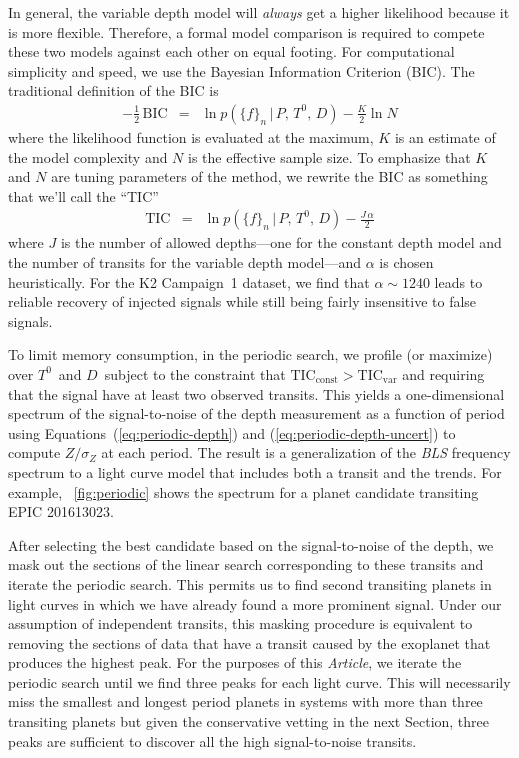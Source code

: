 \documentclass[12pt,preprint]{aastex}
\newcommand{\project}[1]{\textsl{#1}} %
\newcommand{\paper}{\textsl{Article}}
\newcommand{\figref}[1]{\ref{fig:#1}}
\newcommand{\Fig}[1]{\figurename~\figref{#1}}
\newcommand{\fig}[1]{\Fig{#1}}
\newcommand{\sectionname}{Section}
\newcommand{\BIC}{{\ensuremath{\mathrm{BIC}}}}
\newcommand{\TIC}{{\ensuremath{\mathrm{TIC}}}}
\newcommand{\flux}{{\ensuremath{f}}}
\newcommand{\period}{{\ensuremath{P}}}
\newcommand{\phase}{{\ensuremath{T^0}}}
\newcommand{\duration}{{\ensuremath{D}}}
\newcommand{\depth}{{\ensuremath{Z}}}
\begin{document}
In general, the variable depth model will \emph{always} get a higher
likelihood because it is more flexible.
Therefore, a formal model comparison is required to compete these two models
against each other on equal footing.
For computational simplicity and speed, we use the Bayesian Information
Criterion (BIC).
The traditional definition of the BIC is
\begin{eqnarray}
-\frac{1}{2}\,\BIC &=&
    \ln p(\{\flux\}_n\,|\,\period,\,\phase,\,\duration)
    - \frac{K}{2} \ln N
\end{eqnarray}
where the likelihood function is evaluated at the maximum, $K$ is an estimate
of the model complexity and $N$ is the effective sample size.
To emphasize that $K$ and $N$ are tuning parameters of the method, we
rewrite the BIC as something that we'll call the ``TIC''
\begin{eqnarray}
\TIC &=&
    \ln p(\{\flux\}_n\,|\,\period,\,\phase,\,\duration) -
        \frac{J\,\alpha}{2}
\end{eqnarray}
where $J$ is the number of allowed depths---one for the constant depth model
and the number of transits for the variable depth model---and $\alpha$ is
chosen heuristically.
For the K2 Campaign~1 dataset, we find that $\alpha \sim 1240$ leads to
reliable recovery of injected signals while still being fairly insensitive to
false signals.

To limit memory consumption, in the periodic search, we profile (or maximize)
over \phase\ and \duration\ subject to the constraint that
$\TIC_\mathrm{const} > \TIC_\mathrm{var}$ and requiring that the signal have
at least two observed transits.
This yields a one-dimensional spectrum of the signal-to-noise of the depth
measurement as a function of period using Equations~(\ref{eq:periodic-depth})
and (\ref{eq:periodic-depth-uncert}) to compute $\depth/\sigma_\depth$ at
each period.
The result is a generalization of the \project{BLS} frequency spectrum
\citep{bls} to a light curve model that includes both a transit and the
trends.
For example, \fig{periodic} shows the spectrum for a planet candidate
transiting EPIC 201613023.

After selecting the best candidate based on the signal-to-noise of the depth,
we mask out the sections of the linear search corresponding to these transits
and iterate the periodic search.
This permits us to find second transiting planets in light curves in which
we have already found a more prominent signal.
Under our assumption of independent transits, this masking procedure is
equivalent to removing the sections of data that have a transit caused by the
exoplanet that produces the highest peak.
For the purposes of this \paper, we iterate the periodic search until we find
three peaks for each light curve.
This will necessarily miss the smallest and longest period planets in systems
with more than three transiting planets but given the conservative vetting in
the next \sectionname, three peaks are sufficient to discover all the high
signal-to-noise transits.
\end{document}
